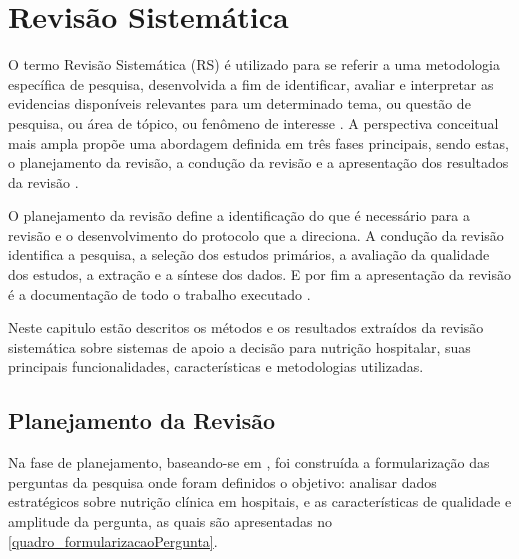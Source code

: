 \chapter{Revisão Sistemática}\label{cap_trabalho_academico}
O termo Revisão Sistemática (RS) é utilizado para se referir a uma metodologia específica de pesquisa, desenvolvida a fim de identificar, avaliar e interpretar as evidencias disponíveis relevantes para um determinado tema, ou questão de pesquisa, ou área de tópico, ou fenômeno de interesse \cite{biolchini2005, kitchenham2004}. A perspectiva conceitual mais ampla propõe uma abordagem definida em três fases principais, sendo estas, o planejamento da revisão, a condução da revisão e a apresentação dos resultados da revisão \cite{biolchini2005}. 

O planejamento da revisão define a identificação do que é necessário para a revisão e o desenvolvimento do protocolo que a direciona. A condução da revisão identifica a pesquisa, a seleção dos estudos primários, a avaliação da qualidade dos estudos, a extração e a síntese dos dados. E por fim a apresentação da revisão é a documentação de todo o trabalho executado \cite{kitchenham2004}.

Neste capitulo estão descritos os métodos e os resultados extraídos da revisão sistemática sobre sistemas de apoio a decisão para nutrição hospitalar, suas principais funcionalidades, características e metodologias utilizadas.

\section{Planejamento da Revisão}

Na fase de planejamento, baseando-se em , foi construída a formularização das perguntas da pesquisa onde foram definidos o objetivo: analisar dados estratégicos sobre nutrição clínica em hospitais, e as características de qualidade e amplitude da pergunta, as quais são apresentadas no \autoref{quadro_formularizacaoPergunta}.
\newline
\newline
\newline

